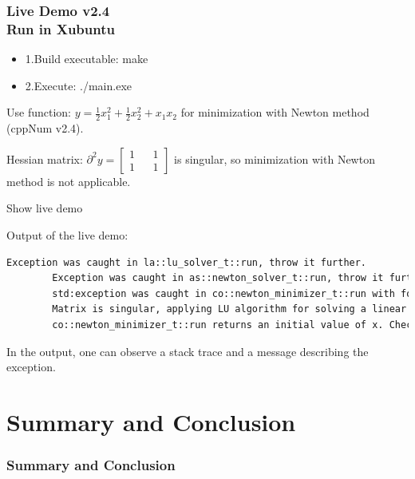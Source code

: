 \documentclass[ucs,10pt]{beamer}
\begin{document}
\begin{frame}[fragile]
\frametitle{Live Demo v2.4 \\
	\small \color{rwth-blue} Run in Xubuntu}
	\begin{itemize}	
			\item 1.Build executable: make
			\item 2.Execute: ./main.exe
	\end{itemize}
	Use function: $y=\frac{1}{2}x_1^2+\frac{1}{2}x_2^2+x_1 x_2$ for minimization with Newton method (cppNum v2.4).

	Hessian matrix: $\partial^2y=\begin{bmatrix}1&&1\\1&&1\end{bmatrix}$ is singular, so minimization with Newton method is not applicable.
	\begin{center}
		\large Show live demo
	\end{center}
	Output of the live demo:
	\begin{lstlisting}[language=bash]
		Exception was caught in la::lu_solver_t::run, throw it further.
		Exception was caught in as::newton_solver_t::run, throw it further.
		std:exception was caught in co::newton_minimizer_t::run with following message:
		Matrix is singular, applying LU algorithm for solving a linear system is not possible.
		co::newton_minimizer_t::run returns an initial value of x. Check the correctness of the input.
	\end{lstlisting}
	In the output, one can observe a stack trace and a message describing the exception. 
\end{frame}



\section{Summary and Conclusion}

\begin{frame}
\frametitle{Summary and Conclusion}
\end{frame}
\end{document}
